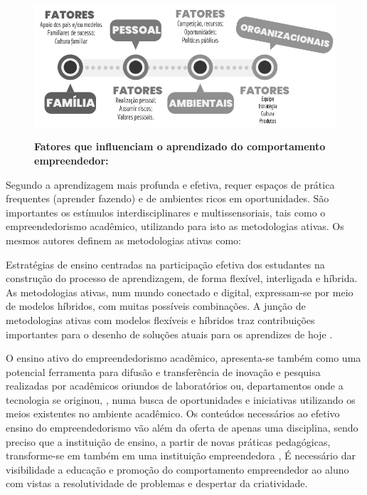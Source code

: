 \begin{figure}[!htb]
\centering
\caption{\textbf{Fatores que influenciam o aprendizado do comportamento empreendedor:}}
\includegraphics[scale=0.8]{Imagens/esquema_influencias_empreendedorismo.png}
\label{figura_2}
\end{figure}


Segundo  a aprendizagem mais profunda e efetiva, requer espaços de prática frequentes (aprender fazendo) e de ambientes ricos em oportunidades.  São importantes os estímulos interdisciplinares e multissensoriais, tais como o empreendedorismo acadêmico, utilizando para isto as metodologias ativas. Os mesmos autores definem as metodologias ativas como:

\begin{citacao}
Estratégias de ensino centradas na participação efetiva dos estudantes na construção do processo de aprendizagem, de forma flexível, interligada e híbrida. As metodologias ativas, num mundo conectado e digital, expressam-se por meio de modelos híbridos, com muitas possíveis combinações. A junção de metodologias ativas com modelos flexíveis e híbridos traz contribuições importantes para o desenho de soluções atuais para os aprendizes de hoje \cite{bacich_metodologias_2018}.
\end{citacao}

O ensino ativo do empreendedorismo acadêmico, apresenta-se também como uma potencial ferramenta para difusão e transferência de inovação e pesquisa realizadas por acadêmicos oriundos de laboratórios ou, departamentos onde a tecnologia se originou, \cite{guo_what_2019, abreu_nature_2013}, numa busca de oportunidades e iniciativas utilizando os meios existentes no ambiente acadêmico. Os conteúdos necessários ao efetivo ensino do empreendedorismo vão além da oferta de apenas uma disciplina, sendo preciso que a instituição de ensino, a partir de novas práticas pedagógicas, transforme-se em também em uma instituição empreendedora \cite{campelli_empreendedorismo_2011}, É necessário dar visibilidade a educação e promoção do comportamento empreendedor ao aluno com vistas a resolutividade de problemas \cite{degen_o_1989} e despertar da criatividade.

